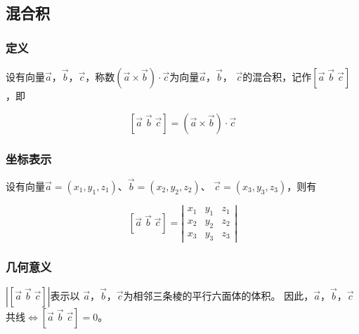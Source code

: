 \documentclass[12pt, a4paper]{article}
\numberwithin{equation}{section}
\begin{document}
\subsection{混合积}

\subsubsection{定义}

    设有向量\(\overrightarrow{a}\)，\(\overrightarrow{b}\)，\(\overrightarrow{c}\)，称数\(\left(\overrightarrow{a}
    \times \overrightarrow{b}\right) \cdot \overrightarrow{c}\)为向量\(\overrightarrow{a}\)，\(\overrightarrow{b}\)，
    \(\overrightarrow{c}\)的混合积，记作\(\left[\overrightarrow{a} \; \overrightarrow{b} \;
    \overrightarrow{c}\right]\)，即

    \[
        \left[\overrightarrow{a} \; \overrightarrow{b} \; \overrightarrow{c}\right] =
        \left(\overrightarrow{a} \times \overrightarrow{b}\right) \cdot \overrightarrow{c}
    \]

\subsubsection{坐标表示}

    设有向量\(\overrightarrow{a} = \left(x_1, y_1, z_1\right)\)、\(\overrightarrow{b} = \left(x_2, y_2, z_2\right)\)、
    \(\overrightarrow{c} = \left(x_3, y_3, z_3\right)\)，则有

    \[
        \left[\overrightarrow{a} \; \overrightarrow{b} \; \overrightarrow{c}\right] =
        \left|
            \begin{array}{cccc}
            x_1 & y_1 & z_1 \\
            x_2 & y_2 & z_2 \\
            x_3 & y_3 & z_3
            \end{array}
        \right|
    \]

\subsubsection{几何意义}

    \(\left|\left[\overrightarrow{a} \; \overrightarrow{b} \; \overrightarrow{c}\right]\right|\)表示以
    \(\overrightarrow{a}\)，\(\overrightarrow{b}\)，\(\overrightarrow{c}\)为相邻三条棱的平行六面体的体积。
    因此，\(\overrightarrow{a}\)，\(\overrightarrow{b}\)，\(\overrightarrow{c}\)共线\(\Leftrightarrow
    \left[\overrightarrow{a} \; \overrightarrow{b} \; \overrightarrow{c}\right] = 0\)。
\end{document}
